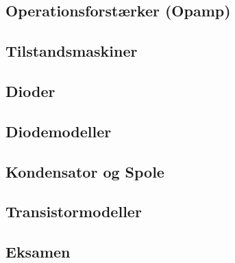 \documentclass[12pt]{article}
\begin{document}
\subsection{Operationsforstærker (Opamp)}


\subsection{Tilstandsmaskiner}


\subsection{Dioder}


\subsection{Diodemodeller}


\subsection{Kondensator og Spole}


\subsection{Transistormodeller}


\subsection{Eksamen}

\end{document}
